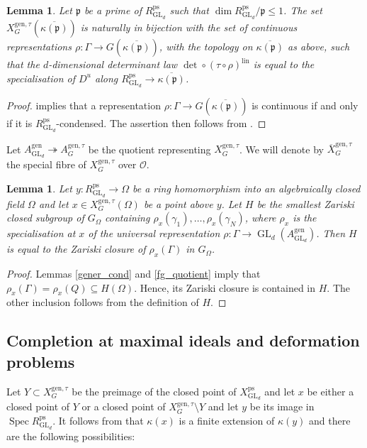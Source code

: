 \documentclass{amsart}
\newtheorem{lem}[prop]{Lemma}
\theoremstyle{definition}
\theoremstyle{remark}
\DeclareMathOperator{\GL}{GL}
\DeclareMathOperator{\Spec}{Spec}
\newcommand{\OO}{\mathcal O}
\newcommand{\pp}{\mathfrak p}
\newcommand{\ps}{\mathrm{ps}}
\newcommand{\gen}{\mathrm{gen}}
\newcommand{\RpsGLd}{R^{\ps}_{\GL_d}}
\newcommand{\lin}{\mathrm{lin}}
\newcommand{\AgenGLd}{A^{\gen}_{\GL_d}}
\newcommand{\XgenGtau}{X^{\gen, \tau}_G}
\newcommand{\XbargenGtau}{\overline{X}^{\gen,\tau}_G}
\newcommand{\AgenGtau}{A^{\gen, \tau}_G}
\begin{document}
\begin{lem}\label{geom_pts} Let $\pp$ be a 
prime of $\RpsGLd$ such that $\dim \RpsGLd/\pp\le 1$.
The set $\XgenGtau(\overline{\kappa(\pp)})$ is naturally in bijection with the set of 
continuous representations $\rho: \Gamma \rightarrow G(\overline{\kappa(\pp)})$, 
with the topology on $\overline{\kappa(\pp)}$ as above,
such that the 
$d$-dimensional determinant law
$\det \circ (\tau\circ \rho)^{\lin}$ is equal to the specialisation of $D^u$ along 
$\RpsGLd\rightarrow \overline{\kappa(\pp)}$. 
\end{lem}
\begin{proof}  implies that a representation 
$\rho: \Gamma\rightarrow G(\overline{\kappa(\pp)})$ is continuous if and only if it is $\RpsGLd$-condensed. The assertion then follows from  .
\end{proof} 





Let $\AgenGLd\twoheadrightarrow \AgenGtau$ be the quotient representing $\XgenGtau$. We will denote by $\XbargenGtau$ the 
special fibre of $\XgenGtau$ over $\OO$.




\begin{lem}\label{dense_again} Let $y: \RpsGLd \rightarrow \Omega$ be a ring  homomorphism 
into an algebraically closed field $\Omega$ and let 
$x\in \XgenGtau(\Omega)$ be a point above $y$.
Let $H$ be the smallest Zariski closed subgroup of $G_{\Omega}$ 
containing $\rho_{x}(\gamma_1), \ldots, \rho_x(\gamma_N)$, where $\rho_x$ is the specialisation at $x$
of the universal representation $\rho: \Gamma \rightarrow \GL_d(A^{\gen}_{\GL_d})$. 
Then $H$ is 
equal to the Zariski closure of $\rho_x(\Gamma)$ in $G_{\Omega}$.
\end{lem}

\begin{proof} Lemmas \ref{gener_cond} and \ref{fg_quotient} imply that 
$\rho_x(\Gamma)=\rho_x(Q)\subseteq H(\Omega)$. Hence, its Zariski closure is contained 
in $H$. The other inclusion follows from the definition of $H$. 
\end{proof} 



\subsection{Completion at maximal ideals and deformation problems}\label{def_probs}
 Let $Y\subset X^{\gen,\tau}_G$ be the preimage of the closed point of $X^{\ps}_{\GL_d}$
 and let 
$x$ be either a closed point of $Y$ or a closed point of $X^{\gen,\tau}_G\setminus Y$ and let $y$ be its image in $\Spec R^{\ps}_{\GL_d}$.
 It follows from \cite[Lemmas 3.17, 3.18]{BIP_new} that 
 $\kappa(x)$ is a finite extension of $\kappa(y)$ and 
 there are the following possibilities:
 
\end{document}
